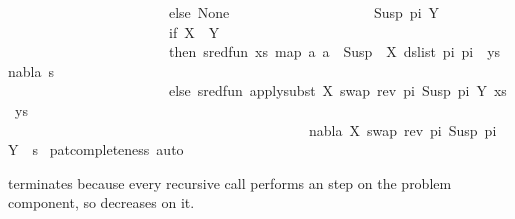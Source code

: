\begin{isabellebody}
\ \ \ \ \ \ \ \ \ \ \ \ \ \ \ \ \ \ \ \ \ \ \ else\ None\isanewline
\ \ \ \ \ \ \ \ \ \ \ \ \ \ \ \ \ \ \ {\isacharbar}{\kern0pt}\ Susp\ pi{}\ Y\ {\isasymRightarrow}\isanewline
\ \ \ \ \ \ \ \ \ \ \ \ \ \ \ \ \ \ \ \ \ \ \ if\ X\ {\isacharequal}{\kern0pt}\ Y\isanewline
\ \ \ \ \ \ \ \ \ \ \ \ \ \ \ \ \ \ \ \ \ \ \ then\ sred{\isacharunderscore}{\kern0pt}fun\ {\isacharparenleft}{\kern0pt}{\isacharparenleft}{\kern0pt}xs{\isacharcomma}{\kern0pt}\ map\ {\isacharparenleft}{\kern0pt}{\isasymlambda}a{\isachardot}{\kern0pt}\ a\ {\isasymsharp}{\isacharquery}{\kern0pt}\ Susp\ {\isacharbrackleft}{\kern0pt}{\isacharbrackright}{\kern0pt}\ X{\isacharparenright}{\kern0pt}\ {\isacharparenleft}{\kern0pt}ds{\isacharunderscore}{\kern0pt}list\ pi\ pi{}{\isacharparenright}{\kern0pt}\ {\isacharat}{\kern0pt}\ ys{\isacharparenright}{\kern0pt}{\isacharcomma}{\kern0pt}\ nabla{\isacharcomma}{\kern0pt}\ s{\isacharparenright}{\kern0pt}\isanewline
\ \ \ \ \ \ \ \ \ \ \ \ \ \ \ \ \ \ \ \ \ \ \ else\ sred{\isacharunderscore}{\kern0pt}fun\ {\isacharparenleft}{\kern0pt}apply{\isacharunderscore}{\kern0pt}subst\ {\isacharbrackleft}{\kern0pt}{\isacharparenleft}{\kern0pt}X{\isacharcomma}{\kern0pt}\ swap\ {\isacharparenleft}{\kern0pt}rev\ pi{\isacharparenright}{\kern0pt}\ {\isacharparenleft}{\kern0pt}Susp\ pi{}\ Y{\isacharparenright}{\kern0pt}{\isacharparenright}{\kern0pt}{\isacharbrackright}{\kern0pt}\ {\isacharparenleft}{\kern0pt}xs{\isacharcomma}{\kern0pt}\ ys{\isacharparenright}{\kern0pt}{\isacharcomma}{\kern0pt}\isanewline
\ \ \ \ \ \ \ \ \ \ \ \ \ \ \ \ \ \ \ \ \ \ \ \ \ \ \ \ \ \ \ \ \ \ \ \ \ \ \ \ \ \ \ nabla{\isacharcomma}{\kern0pt}\ {\isacharbrackleft}{\kern0pt}{\isacharparenleft}{\kern0pt}X{\isacharcomma}{\kern0pt}\ swap\ {\isacharparenleft}{\kern0pt}rev\ pi{\isacharparenright}{\kern0pt}\ {\isacharparenleft}{\kern0pt}Susp\ pi{}\ Y{\isacharparenright}{\kern0pt}{\isacharparenright}{\kern0pt}{\isacharbrackright}{\kern0pt}\ {\isasymbullet}\ s{\isacharparenright}{\kern0pt}{\isacharparenright}{\kern0pt}{\isacharparenright}{\kern0pt}{\isachardoublequoteclose}\isanewline
%
\isadelimproof
%
\endisadelimproof
%
\isatagproof
{}\isamarkupfalse%
\ pat{\isacharunderscore}{\kern0pt}completeness\ auto%
\endisatagproof
{\isafoldproof}%
%
\isadelimproof
%
\endisadelimproof
%
\begin{isamarkuptext}%
 terminates because every recursive call performs an  step on
the problem component, so  decreases on it.%

\end{isamarkuptext}
\end{isabellebody}
